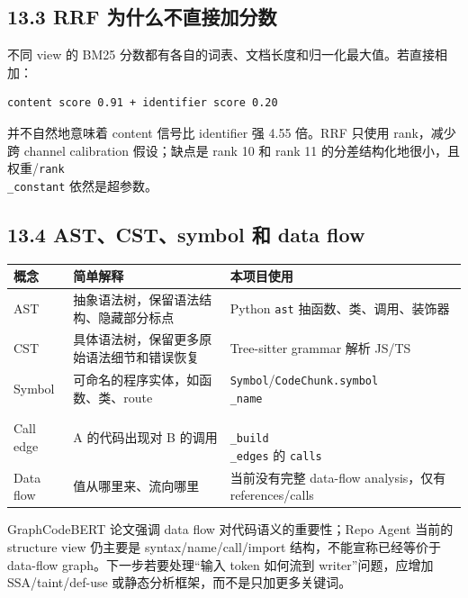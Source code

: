 \documentclass[UTF8,12pt,openany]{ctexbook}
\begin{document}
\subsection{13.3 RRF 为什么不直接加分数}

不同 view 的 BM25 分数都有各自的词表、文档长度和归一化最大值。若直接相加：\par

\begin{lstlisting}
content score 0.91 + identifier score 0.20
\end{lstlisting}

并不自然地意味着 content 信号比 identifier 强 4.55 倍。RRF 只使用 rank，减少跨 channel calibration 假设；缺点是 rank 10 和 rank 11 的分差结构化地很小，且权重/\texttt{rank\\_constant} 依然是超参数。\par

\subsection{13.4 AST、CST、symbol 和 data flow}

\begin{center}
\small
\begin{longtable}{|p{}|p{}|p{}|}
\toprule
概念 & 简单解释 & 本项目使用 \\
\midrule
AST & 抽象语法树，保留语法结构、隐藏部分标点 & Python \texttt{ast} 抽函数、类、调用、装饰器 \\
CST & 具体语法树，保留更多原始语法细节和错误恢复 & Tree-sitter grammar 解析 JS/TS \\
Symbol & 可命名的程序实体，如函数、类、route & \texttt{Symbol}/\texttt{CodeChunk.symbol\\_name} \\
Call edge & A 的代码出现对 B 的调用 & \texttt{\\_build\\_edges} 的 \texttt{calls} \\
Data flow & 值从哪里来、流向哪里 & 当前没有完整 data-flow analysis，仅有 references/calls \\
\bottomrule
\end{longtable}
\end{center}

GraphCodeBERT 论文强调 data flow 对代码语义的重要性；Repo Agent 当前的 structure view 仍主要是 syntax/name/call/import 结构，不能宣称已经等价于 data-flow graph。下一步若要处理“输入 token 如何流到 writer”问题，应增加 SSA/taint/def-use 或静态分析框架，而不是只加更多关键词。\par
\end{document}
